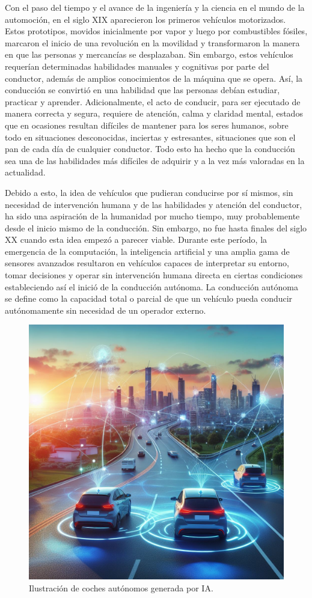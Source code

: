Con el paso del tiempo y el avance de la ingeniería y la ciencia en el mundo de la automoción, en el siglo XIX aparecieron los primeros vehículos motorizados. Estos prototipos, movidos inicialmente por vapor y luego por combustibles fósiles, marcaron el inicio de una revolución en la movilidad y transformaron la manera en que las personas y mercancías se desplazaban. Sin embargo, estos vehículos requerían determinadas habilidades manuales y cognitivas por parte del conductor, además de amplios conocimientos de la máquina que se opera. Así, la conducción se convirtió en una habilidad que las personas debían estudiar, practicar y aprender. Adicionalmente, el acto de conducir, para ser ejecutado de manera correcta y segura, requiere de atención, calma y claridad mental, estados que en ocasiones resultan difíciles de mantener para los seres humanos, sobre todo en situaciones desconocidas, inciertas y estresantes, situaciones que son el pan de cada día de cualquier conductor. Todo esto ha hecho que la conducción sea una de las habilidades más difíciles de adquirir y a la vez más valoradas en la actualidad.

\bigskip

Debido a esto, la idea de vehículos que pudieran conducirse por sí mismos, sin necesidad de intervención humana y de las habilidades y atención del conductor, ha sido una aspiración de la humanidad por mucho tiempo, muy probablemente desde el inicio mismo de la conducción. Sin embargo, no fue hasta finales del siglo XX cuando esta idea empezó a parecer viable. Durante este período, la emergencia de la computación, la inteligencia artificial y una amplia gama de sensores avanzados resultaron en vehículos capaces de interpretar su entorno, tomar decisiones y operar sin intervención humana directa en ciertas condiciones estableciendo así el inició de la conducción autónoma. La conducción autónoma se define como la capacidad total o  parcial de que un vehículo pueda conducir autónomamente sin necesidad de un operador externo. \cite{la-conducción-autónoma}

\begin{figure}[h] 
    \centering
    \includegraphics[width=0.7\linewidth]{imagenes/cap1/conduccion_autonoma.png} 
    \caption{Ilustración de coches autónomos generada por \ac{IA}.}
    \label{Ilustración de coches autónomos generada por IA}
\end{figure}



